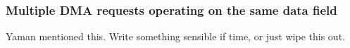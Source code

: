 \subsubsection{Multiple DMA requests operating on the same data field}
Yaman mentioned this. Write something sensible if time, or just wipe this out.


% 



%

%
%

